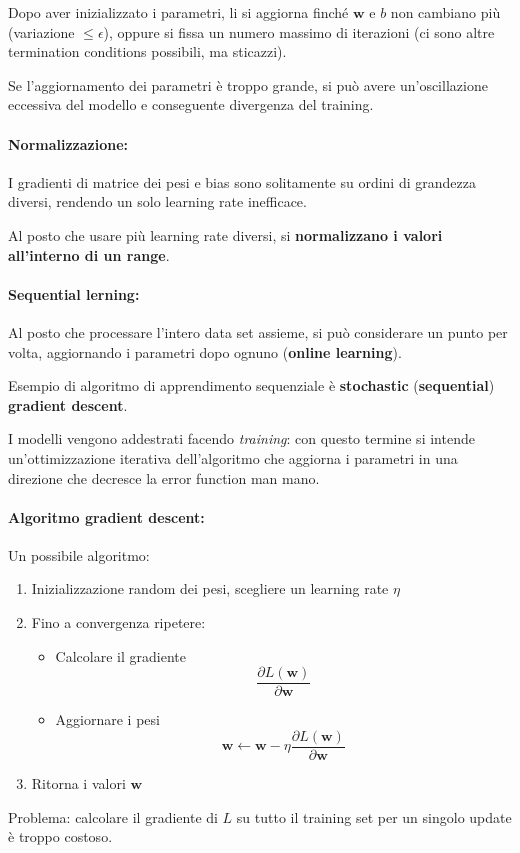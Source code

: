 Dopo aver inizializzato i parametri, li si aggiorna finché $\bm w$ e $b$ non cambiano più (variazione $\leq \epsilon$), oppure si fissa un numero massimo di iterazioni (ci sono altre termination conditions possibili, ma sticazzi).

Se l'aggiornamento dei parametri è troppo grande, si può avere un'oscillazione eccessiva del modello e conseguente divergenza del training.

\paragraph{Normalizzazione:} I gradienti di matrice dei pesi e bias sono solitamente su ordini di grandezza diversi, rendendo un solo learning rate inefficace. 

Al posto che usare più learning rate diversi, si \textbf{normalizzano i valori all'interno di un range}.

\paragraph{Sequential lerning:} Al posto che processare l'intero data set assieme, si può considerare un punto per volta, aggiornando i parametri dopo ognuno (\textbf{online learning}).

Esempio di algoritmo di apprendimento sequenziale è \textbf{stochastic} (\textbf{sequential}) \textbf{gradient descent}. 

I modelli vengono addestrati facendo \textit{training}: con questo termine si intende un'ottimizzazione iterativa dell'algoritmo che aggiorna i parametri in una direzione che decresce la error function man mano.

\paragraph{Algoritmo gradient descent:} Un possibile algoritmo:
\begin{enumerate}
    \item Inizializzazione random dei pesi, scegliere un learning rate $\eta$
    
    \item Fino a convergenza ripetere:
    \begin{itemize}
        \item Calcolare il gradiente
        $$ \frac{\partial L (\bm w)}{\partial \bm w} $$
        
        \item Aggiornare i pesi
        $$ \bm w \leftarrow \bm w - \eta \frac{\partial L (\bm w)}{\partial \bm w} $$
    \end{itemize}
    
    \item Ritorna i valori $\bm w$
\end{enumerate}
Problema: calcolare il gradiente di $L$ su tutto il training set per un singolo update è troppo costoso.

